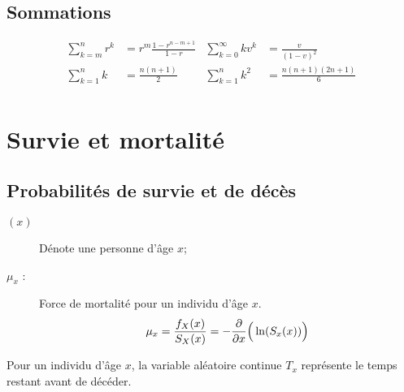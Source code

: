 \documentclass[10pt, french]{article}
\begin{document}
\begin{multicols*}{3}
\setlength{\mathindent}{1cm}

\subsection*{Sommations}
\begin{align*}
\sum_{k = m}^{n} r^k &= r^{m} \frac{1 - r^{n - m + 1}}{1 - r} &
\sum_{k = 0}^{\infty}k v^k &= \frac{v}{(1 - v)^2} \\
\sum_{k = 1}^{n}k &= \frac{n(n + 1)}{2} &
\sum_{k = 1}^{n}k^2 &= \frac{n(n + 1)(2n + 1)}{6} \\
\end{align*}

\newpage

\section{Survie et mortalité}
\setcounter{subsection}{1}
\subsection{Probabilités de survie et de décès}
\begin{description}
	\item[$(x)$]	Dénote une personne d'âge $x$;
	\item[$\mu_{x}$ : ] Force de mortalité pour un individu d'âge $x$.
		\begin{align*}
		\mu_{x}
		&=	\frac{f_{X}(x)}{S_X(x)} 
		=	-\frac{\partial}{\partial x} \Big( \ln(S_{x}(x))\Big)	\\
		\end{align*}
\end{description}

\begin{definitionNOHFILLsub}
Pour un individu d'âge $x$, la variable aléatoire continue $T_{x}$ représente le temps restant avant de décéder.\\


\end{definitionNOHFILLsub}
\end{multicols*}
\end{document}
